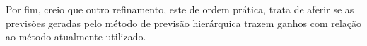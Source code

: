 \documentclass[
	12pt,				%
	openright,			%
	twoside,			%
	a4paper,			%
	english,			%
	french,				%
	spanish,			%
	brazil				%
	]{abntex2}
\begin{document}
Por fim, creio que outro refinamento, este de ordem prática, trata de aferir se as previsões geradas pelo método de previsão hierárquica trazem ganhos com relação ao método atualmente utilizado. 



\postextual



%
%

\end{document}
